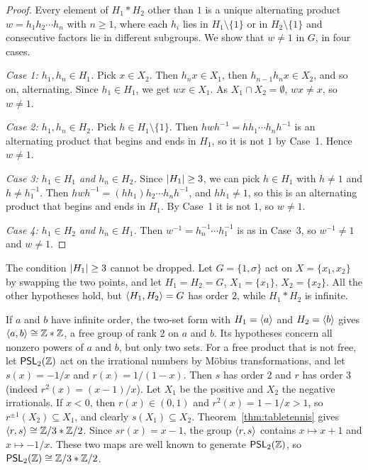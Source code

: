 \begin{proof}
Every element of $H_1 * H_2$ other than $1$ is a unique alternating product
$w = h_1 h_2 \cdots h_n$ with $n \ge 1$, where each $h_i$ lies in
$H_1 \setminus \{1\}$ or in $H_2 \setminus \{1\}$ and consecutive factors lie
in different subgroups. We show that $w \ne 1$ in $G$, in four cases.

\emph{Case 1: $h_1, h_n \in H_1$.} Pick $x \in X_2$. Then $h_n x \in X_1$,
then $h_{n-1} h_n x \in X_2$, and so on, alternating. Since $h_1 \in H_1$, we
get $wx \in X_1$. As $X_1 \cap X_2 = \emptyset$, $wx \ne x$, so $w \ne 1$.

\emph{Case 2: $h_1, h_n \in H_2$.} Pick $h \in H_1 \setminus \{1\}$. Then
$h w h^{-1} = h h_1 \cdots h_n h^{-1}$ is an alternating product that begins
and ends in $H_1$, so it is not $1$ by Case~1. Hence $w \ne 1$.

\emph{Case 3: $h_1 \in H_1$ and $h_n \in H_2$.} Since $\left|H_1\right| \ge 3$, we
can pick $h \in H_1$ with $h \ne 1$ and $h \ne h_1^{-1}$. Then
$h w h^{-1} = (h h_1) h_2 \cdots h_n h^{-1}$, and $h h_1 \ne 1$, so this is an
alternating product that begins and ends in $H_1$. By Case~1 it is not $1$, so
$w \ne 1$.

\emph{Case 4: $h_1 \in H_2$ and $h_n \in H_1$.} Then
$w^{-1} = h_n^{-1} \cdots h_1^{-1}$ is as in Case~3, so $w^{-1} \ne 1$ and
$w \ne 1$.
\end{proof}

\begin{remark}\label{rem:three}
The condition $\left|H_1\right| \ge 3$ cannot be dropped. Let $G = \{1, \sigma\}$
act on $X = \{x_1, x_2\}$ by swapping the two points, and let
$H_1 = H_2 = G$, $X_1 = \{x_1\}$, $X_2 = \{x_2\}$. All the other hypotheses
hold, but $\langle H_1, H_2 \rangle = G$ has order $2$, while $H_1 * H_2$ is infinite.
\end{remark}

\begin{example}\label{ex:freeproduct}
If $a$ and $b$ have infinite order, the two-set form with
$H_1 = \langle a \rangle$ and $H_2 = \langle b \rangle$ gives $\langle a,b \rangle \cong \mathbb{Z} * \mathbb{Z}$, a free
group of rank $2$ on $a$ and $b$. Its hypotheses concern all nonzero powers of
$a$ and $b$, but only two sets. For a free product that is not free, let
$\mathsf{PSL}_2(\mathbb{Z})$ act on the irrational numbers by M\"obius transformations, and let
$s(x) = -1/x$ and $r(x) = 1/(1-x)$. Then $s$ has order $2$ and $r$ has
order $3$ (indeed $r^2(x) = (x-1)/x$). Let $X_1$ be the positive and $X_2$
the negative irrationals. If $x < 0$, then $r(x) \in (0,1)$ and
$r^2(x) = 1 - 1/x > 1$, so $r^{\pm1}(X_2) \subseteq X_1$, and clearly
$s(X_1) \subseteq X_2$. Theorem~\ref{thm:tabletennis} gives
$\langle r, s \rangle \cong \mathbb{Z}/3 * \mathbb{Z}/2$. Since $s r (x) = x - 1$, the group $\langle r,s \rangle$
contains $x \mapsto x + 1$ and $x \mapsto -1/x$. These two maps are well
known to generate $\mathsf{PSL}_2(\mathbb{Z})$, so $\mathsf{PSL}_2(\mathbb{Z}) \cong \mathbb{Z}/3 * \mathbb{Z}/2$.
\end{example}
